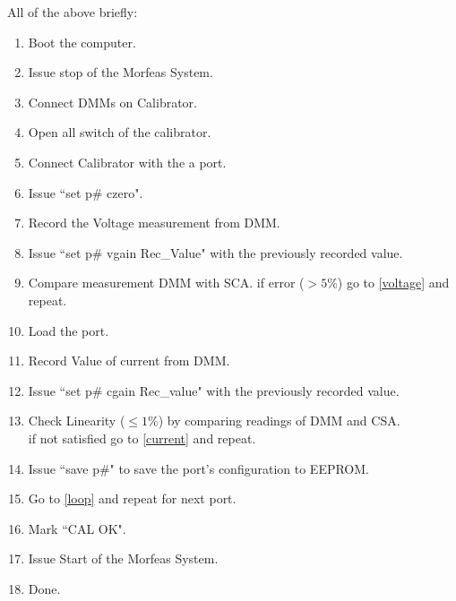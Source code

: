 All of the above briefly:
\begin{enumerate}
	\item Boot the computer.
	\item Issue stop of the Morfeas System.
	\item Connect DMMs on Calibrator.
	\item Open all switch of the calibrator.
	\item Connect Calibrator with the a port.\label{loop}
	\item Issue ``set p\# czero".
	\item Record the Voltage measurement from DMM.\label{voltage}
	\item Issue ``set p\# vgain Rec\_Value" with the previously recorded value.
	\item Compare measurement DMM with SCA. if error ($>5\%$) go to \ref{voltage} and repeat.
	\item Load the port.\label{current}
	\item Record Value of current from DMM.
	\item Issue ``set p\# cgain Rec\_value" with the previously recorded value.
	\item Check Linearity ($\leq1\%$) by comparing readings of DMM and CSA.\\ if not satisfied go to \ref{current} and repeat.
	\item Issue ``save p\#" to save the port's configuration to EEPROM.
	\item Go to \ref{loop} and repeat for next port.
	\item Mark ``CAL OK". 
	\item Issue Start of the Morfeas System.
	\item Done.
\end{enumerate}
